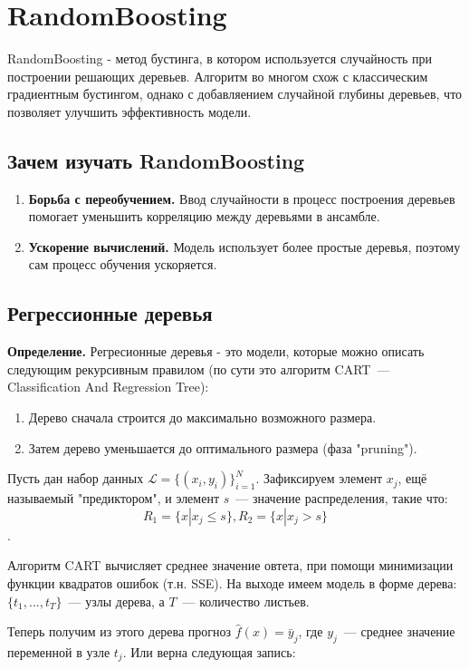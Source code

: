 \section*{RandomBoosting}

RandomBoosting - метод бустинга, в котором используется случайность при построении решающих деревьев. Алгоритм во многом схож с классическим градиентным бустингом, однако с добавляением случайной глубины деревьев, что позволяет улучшить эффективность модели.

\subsection*{Зачем изучать RandomBoosting}
\begin{enumerate}
    \item \textbf{Борьба с переобучением.} Ввод случайности в процесс построения деревьев помогает уменьшить корреляцию между деревьями в ансамбле.
    \item \textbf{Ускорение вычислений.} Модель использует более простые деревья, поэтому сам процесс обучения ускоряется.
\end{enumerate}

\subsection*{Регрессионные деревья}
\textbf{Определение.} Регресионные деревья - это модели, которые можно описать следующим рекурсивным правилом (по сути это алгоритм CART~--- Classification And Regression Tree):
\begin{enumerate}
    \item Дерево сначала строится до максимально возможного размера.
    \item Затем дерево уменьшается до оптимального размера (фаза "pruning").
\end{enumerate}

Пусть дан набор данных $\mathcal{L} = \{(x_i, y_i)\}_{i = 1}^N$. Зафиксируем элемент $x_j$, ещё называемый "предиктором", и элемент $s$~--- значение распределения, такие что:
$$R_1 = \{x | x_j \leq s\}, R_2=\{x | x_j > s\}$$.

Алгоритм CART вычисляет среднее значение овтета, при помощи минимизации функции квадратов ошибок (т.н. SSE). На выходе имеем модель в форме дерева: $\{t_1, ...,t_T\}$~--- узлы дерева, а $T$~--- количество листьев.

Теперь получим из этого дерева прогноз $\hat{f}(x)=\bar{y}_j$, где $y_j$~--- среднее значение переменной в узле $t_j$. Или верна следующая запись:

